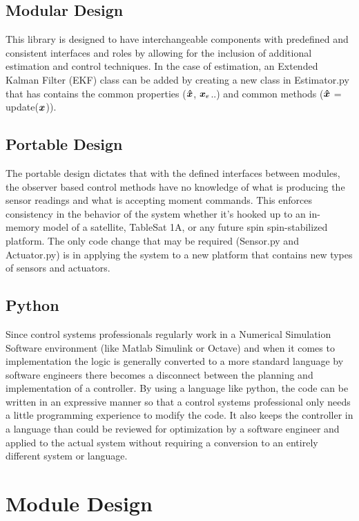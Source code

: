 \subsection{Modular Design}

This library is designed to have interchangeable components with predefined and consistent interfaces and roles by allowing for the inclusion of additional estimation and control techniques. In the case of estimation, an Extended Kalman Filter (EKF) class can be added by creating a new class in Estimator.py that has contains the common properties ($\boldsymbol{\hat{x}}$, $\boldsymbol{x}_e$..) and common methods ($\boldsymbol{\hat{x}}$ = update($\boldsymbol{x}$)).

\subsection{Portable Design}

The portable design dictates that with the defined interfaces between modules, the observer based control methods have no knowledge of what is producing the sensor readings and what is accepting moment commands. This enforces consistency in the behavior of the system whether it's hooked up to an in-memory model of a satellite, TableSat 1A, or any future spin spin-stabilized platform. The only code change that may be required (Sensor.py and Actuator.py) is in applying the system to a new platform that contains new types of sensors and actuators.

\subsection{Python}

Since control systems professionals regularly work in a Numerical Simulation Software environment (like Matlab Simulink or Octave) and when it comes to implementation the logic is generally converted to a more standard language by software engineers there becomes a disconnect between the planning and implementation of a controller. By using a language like python, the code can be written in an expressive manner so that a control systems professional only needs a little programming experience to modify the code. It also keeps the controller in a language than could be reviewed for optimization by a software engineer and applied to the actual system without requiring a conversion to an entirely different system or language.




\section{Module Design}
\label{sec:Module Design}

